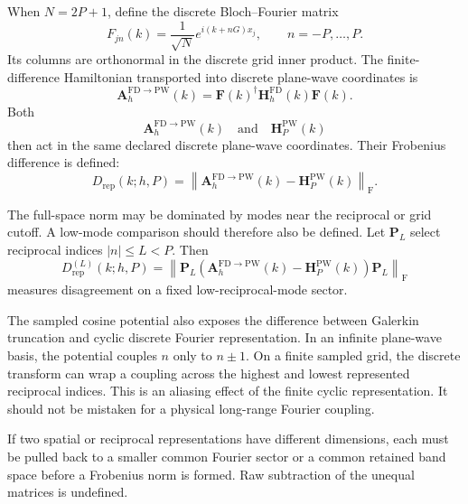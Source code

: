 When $N=2P+1$, define the discrete Bloch--Fourier matrix
\begin{equation}
    F_{jn}(k)
    =
    \frac{1}{\sqrt N}
    e^{i(k+nG)x_j},
    \qquad
    n=-P,\ldots,P.
\end{equation}
Its columns are orthonormal in the discrete grid inner product. The
finite-difference Hamiltonian transported into discrete plane-wave coordinates
is
\begin{equation}
    \mathbf A_h^{\mathrm{FD}\rightarrow\mathrm{PW}}(k)
    =
    \mathbf F(k)^\dagger
    \mathbf H_h^{\mathrm{FD}}(k)
    \mathbf F(k).
\end{equation}
Both
\begin{equation}
    \mathbf A_h^{\mathrm{FD}\rightarrow\mathrm{PW}}(k)
    \quad\text{and}\quad
    \mathbf H_P^{\mathrm{PW}}(k)
\end{equation}
then act in the same declared discrete plane-wave coordinates. Their Frobenius
difference is defined:
\begin{equation}
    D_{\mathrm{rep}}(k;h,P)
    =
    \left\lVert
        \mathbf A_h^{\mathrm{FD}\rightarrow\mathrm{PW}}(k)
        -
        \mathbf H_P^{\mathrm{PW}}(k)
    \right\rVert_{\mathrm F}.
\end{equation}

The full-space norm may be dominated by modes near the reciprocal or grid
cutoff. A low-mode comparison should therefore also be defined. Let
$\mathbf P_L$ select reciprocal indices $|n|\leq L<P$. Then
\begin{equation}
    D_{\mathrm{rep}}^{(L)}(k;h,P)
    =
    \left\lVert
        \mathbf P_L
        \left(
            \mathbf A_h^{\mathrm{FD}\rightarrow\mathrm{PW}}(k)
            -
            \mathbf H_P^{\mathrm{PW}}(k)
        \right)
        \mathbf P_L
    \right\rVert_{\mathrm F}
\end{equation}
measures disagreement on a fixed low-reciprocal-mode sector.

The sampled cosine potential also exposes the difference between Galerkin
truncation and cyclic discrete Fourier representation. In an infinite
plane-wave basis, the potential couples $n$ only to $n\pm1$. On a finite
sampled grid, the discrete transform can wrap a coupling across the highest and
lowest represented reciprocal indices. This is an aliasing effect of the
finite cyclic representation. It should not be mistaken for a physical
long-range Fourier coupling.

If two spatial or reciprocal representations have different dimensions, each
must be pulled back to a smaller common Fourier sector or a common retained
band space before a Frobenius norm is formed. Raw subtraction of the unequal
matrices is undefined.

